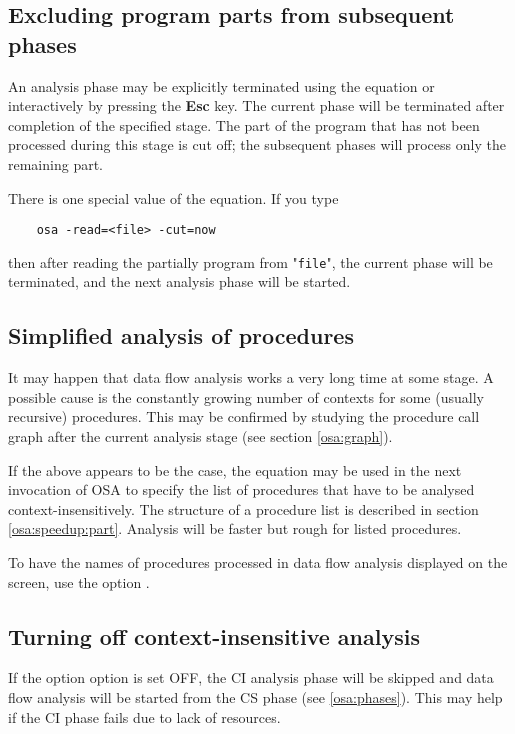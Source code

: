 \subsection{Excluding program parts from subsequent phases}
\label{osa:speedup:cut}

An analysis phase may be explicitly terminated using the equation 
 or interactively by pressing the {\bf Esc} key.
The current phase will be terminated after completion of the
specified stage. The part of the program that has not been
processed during this stage is cut off; the subsequent phases 
will process only the remaining part.

There is one special value of the  equation. If you type 

\verb'    osa -read=<file> -cut=now' 

then after reading the partially program from "\verb'file'", 
the current phase will be terminated, and the next analysis 
phase will be started.


\subsection{Simplified analysis of procedures}
\label{osa:speedup:nocsa}

It may happen that data flow analysis works a very long time
at some stage. A possible cause is the constantly growing number of contexts
for some (usually recursive) procedures. This may be confirmed
by studying the procedure call graph after the current analysis stage
(see section \ref{osa:graph}).

If the above appears to be the case, the equation  may be used 
in the next invocation of OSA to specify the list of procedures
that have to be analysed context-insensitively. 
The structure of a procedure list is described in section \ref{osa:speedup:part}.
Analysis will be faster but rough for listed procedures.

To have the names of procedures processed in data flow analysis
displayed on the screen, use the option .


\subsection{Turning off context-insensitive analysis}
\label{osa:speedup:nocia}

If the option  option is set OFF, the CI analysis phase 
will be skipped and data flow analysis will be started from the CS phase
(see \ref{osa:phases}).
This may help if the CI phase fails due to lack of resources.


